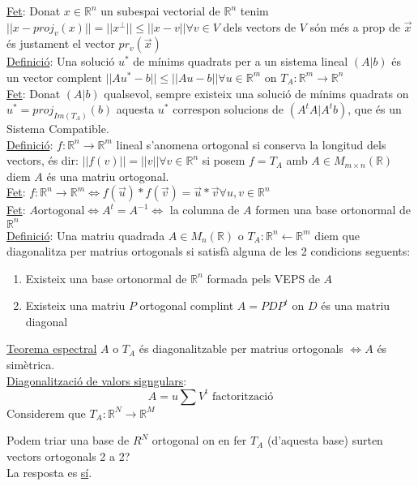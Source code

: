 \documentclass[../main.tex]{subfiles}
\begin{document}
    \underline{Fet}: Donat $x \in \mathbb{R}^n$ un subespai vectorial de $\mathbb{R}^n$ tenim $||x-proj_v(x)|| = ||x^\perp||\leq ||x-v|| \forall v \in V$ dels vectors de $V$ són més a prop de $\Vec{x}$ és justament el vector $pr_v(\Vec{x})$\\
    \underline{Definició}: Una solució $u^*$ de mínims quadrats per a un sistema lineal $(A|b)$ és un vector complent $||Au^*-b|| \leq ||Au-b|| \forall u \in \mathbb{R}^m$ on $T_A: \mathbb{R}^m \rightarrow \mathbb{R}^n$\\
    \underline{Fet}: Donat $(A|b)$ qualsevol, sempre existeix una solució de mínims quadrats on $u^* = proj_{Im(T_A)}(b)$ aquesta $u^*$ correspon solucions de $(A^tA|A^tb)$, que és un Sistema Compatible.\\
    \underline{Definició}: $f: \mathbb{R}^n \rightarrow \mathbb{R}^m$ lineal s'anomena ortogonal si conserva la longitud dels vectors, és dir: $||f(v)||=||v|| \forall v \in \mathbb{R}^n$ si posem $f=T_A$ amb $A \in M_{m\times n}(\mathbb{R})$ diem $A$ és una matriu ortogonal.\\
    \underline{Fet}: $f: \mathbb{R}^n \rightarrow \mathbb{R}^m \Leftrightarrow f(\vec{u})*f(\vec{v}) = \vec{u}*\vec{v} \forall u, v \in \mathbb{R}^n$ \\
    \underline{Fet}: $A \text{ortogonal} \Leftrightarrow A^t=A^{-1} \Leftrightarrow$ la columna de $A$ formen una base ortonormal de $\mathbb{R}^n$\\
    \underline{Definició}: Una matriu quadrada $A \in M_n(\mathbb{R})$ o $T_A: \mathbb{R}^n \leftarrow \mathbb{R}^m$ diem que diagonalitza per matrius ortogonals si satisfà alguna de les 2 condicions seguents:
    \begin{enumerate}
        \item Existeix una base ortonormal de $\mathbb{R}^n$ formada pels VEPS de $A$
        \item Existeix una matriu $P$ ortogonal complint $A=PDP^t$ on $D$ és una matriu diagonal
    \end{enumerate}
    \underline{Teorema espectral} $A$ o $T_A$ és diagonalitzable per matrius ortogonals $\Leftrightarrow A$ és simètrica.\\
    \underline{Diagonalització de valors signgulars}:
    \begin{displaymath}
        A = u \sum V^t \text{ factorització}
    \end{displaymath}
    Considerem que $T_A : \mathbb{R}^N \rightarrow \mathbb{R}^M$\\
    \begin{obs}
        Podem triar una base de $R^N$ ortogonal on en fer $T_A$ (d'aquesta base) surten vectors ortogonals 2 a 2?\\
        La resposta es \underline{sí}.
    \end{obs}
\end{document}
